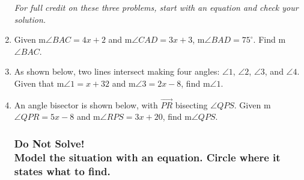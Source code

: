 \begin{enumerate}
\newpage
\emph{For full credit on these three problems, start with an equation and check your solution.}
\item Given m$\angle BAC = 4x+2$ and m$\angle CAD = 3x+3$, m$\angle BAD=75^\circ$. Find m$\angle BAC$.
  \begin{flushright}
  \end{flushright} \vspace{1.5cm}

\item As shown below, two lines intersect making four angles: $\angle 1$, $\angle 2$, $\angle 3$, and $\angle 4$. Given that m$\angle 1= x+32$ and m$\angle 3=2x-8$, find m$\angle 1$.
  \begin{flushright}
    \end{flushright} \vspace{1cm}

\item An angle bisector is shown below, with $\overrightarrow{PR}$ bisecting $\angle QPS$. Given m$\angle QPR = 5x-8$ and m$\angle RPS = 3x+20$, find m$\angle QPS$.
    \begin{flushright}
    \end{flushright}

\newpage
\subsubsection*{Do Not Solve! \\
Model the situation with an equation. Circle where it states what to find.}


\end{enumerate}
